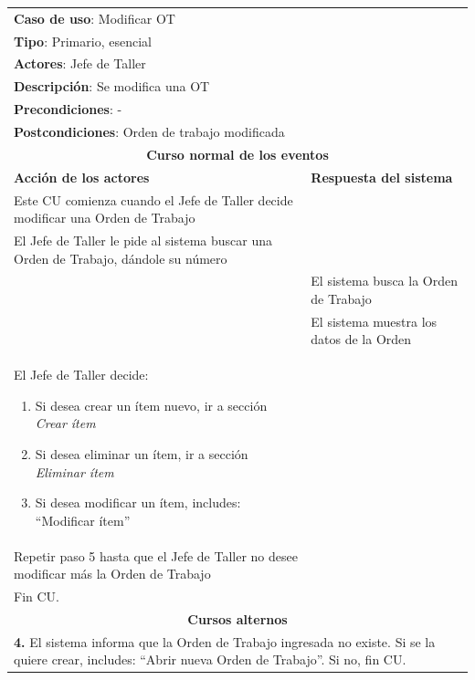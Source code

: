 \documentclass[12pt]{extarticle}
\begin{document}
\begin{spacing}{1.2}
	\begin{longtable}{ |p{8cm}|p{8cm}| }
		\hline
		\multicolumn{2}{|p{16cm}|}{\textbf{Caso de uso}: Modificar OT}\\
		\multicolumn{2}{|p{16cm}|}{\textbf{Tipo}: Primario, esencial}\\
		\multicolumn{2}{|p{16cm}|}{\textbf{Actores}: Jefe de Taller}\\
		\multicolumn{2}{|p{16cm}|}{\textbf{Descripción}: Se modifica una OT}\\
		\multicolumn{2}{|p{16cm}|}{\textbf{Precondiciones}: -}\\
		\multicolumn{2}{|p{16cm}|}{\textbf{Postcondiciones}: Orden de trabajo modificada}\\
		\hline
		\multicolumn{2}{|c|}{\textbf{Curso normal de los eventos}}\\
		\hline
		\textbf{Acción de los actores} & \textbf{Respuesta del sistema}\\
		\hline
			\inc Este CU comienza cuando el Jefe de Taller decide modificar una Orden de Trabajo& \\
			\hline
			\inc El Jefe de Taller le pide al sistema buscar una Orden de Trabajo, dándole su número & \\
			\hline
			& \inc El sistema busca la Orden de Trabajo \\
			\hline
			& \inc El sistema muestra los datos de la Orden \\
			\hline
			\inc El Jefe de Taller decide:
            \begin{enumerate}[label=(\alph*)]
                \item Si desea crear un ítem nuevo, ir a sección \textit{Crear ítem}
                \item Si desea eliminar un ítem, ir a sección \textit{Eliminar ítem}
                \item Si desea modificar un ítem, includes: ``Modificar ítem'' 
            \end{enumerate}        & \\
			\hline
			\inc  Repetir paso 5 hasta que el Jefe de Taller no desee modificar más la Orden de Trabajo& \\
			\hline
			\inc Fin CU. & \\
		\hline
		\multicolumn{2}{|c|}{\textbf{Cursos alternos}}\\
		\hline
        \multicolumn{2}{|p{16cm}|}{\textbf{4. }El sistema informa que la Orden de Trabajo ingresada no existe. Si se la quiere crear, includes: ``Abrir nueva Orden de Trabajo''. Si no, fin CU.}\\
		\hline
	\end{longtable}


\end{spacing}
\end{document}

